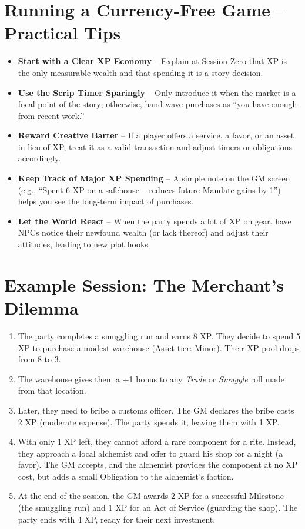 \section{Running a Currency-Free Game -- Practical Tips}
\begin{tcolorbox}[colback=blue!5!white, colframe=blue!75!black, title={GM Tips for a Currency-Free Table},breakable]
\begin{itemize}
  \item \textbf{Start with a Clear XP Economy} -- Explain at Session Zero that XP is the only measurable wealth and that spending it is a story decision.
  \item \textbf{Use the Scrip Timer Sparingly} -- Only introduce it when the market is a focal point of the story; otherwise, hand-wave purchases as ``you have enough from recent work.''
  \item \textbf{Reward Creative Barter} -- If a player offers a service, a favor, or an asset in lieu of XP, treat it as a valid transaction and adjust timers or obligations accordingly.
  \item \textbf{Keep Track of Major XP Spending} -- A simple note on the GM screen (e.g., ``Spent 6 XP on a safehouse -- reduces future Mandate gains by 1'') helps you see the long-term impact of purchases.
  \item \textbf{Let the World React} -- When the party spends a lot of XP on gear, have NPCs notice their newfound wealth (or lack thereof) and adjust their attitudes, leading to new plot hooks.
\end{itemize}
\end{tcolorbox}

\section{Example Session: The Merchant's Dilemma}
\begin{enumerate}
  \item The party completes a smuggling run and earns 8 XP. They decide to spend 5 XP to purchase a modest warehouse (Asset tier: Minor). Their XP pool drops from 8 to 3.
  \item The warehouse gives them a +1 bonus to any \textit{Trade} or \textit{Smuggle} roll made from that location.
  \item Later, they need to bribe a customs officer. The GM declares the bribe costs 2 XP (moderate expense). The party spends it, leaving them with 1 XP.
  \item With only 1 XP left, they cannot afford a rare component for a rite. Instead, they approach a local alchemist and offer to guard his shop for a night (a favor). The GM accepts, and the alchemist provides the component at no XP cost, but adds a small Obligation to the alchemist's faction.
  \item At the end of the session, the GM awards 2 XP for a successful Milestone (the smuggling run) and 1 XP for an Act of Service (guarding the shop). The party ends with 4 XP, ready for their next investment.
\end{enumerate}

